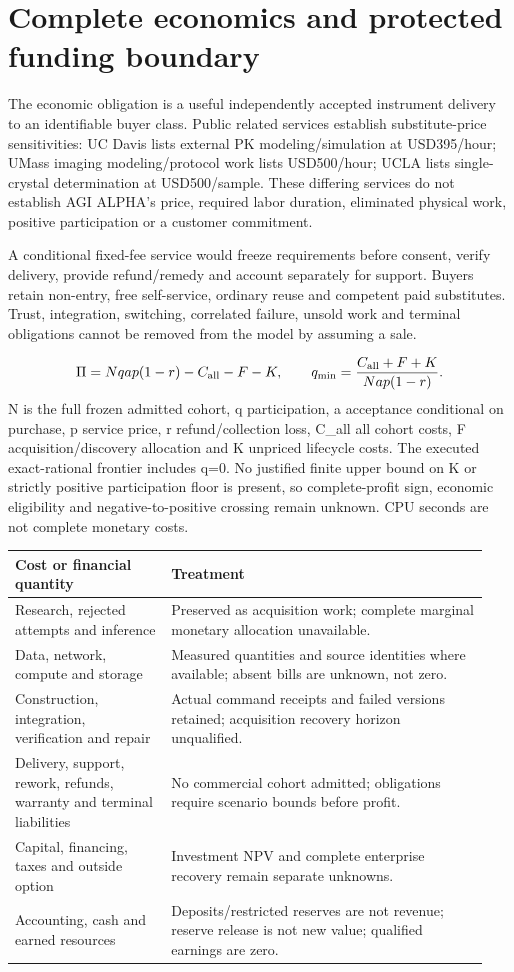 \documentclass[11pt,letterpaper]{article}
\begin{document}
\section{Complete economics and protected funding boundary}
The economic obligation is a useful independently accepted instrument delivery to an identifiable buyer class. Public related services establish substitute-price sensitivities: UC Davis lists external PK modeling/simulation at USD395/hour; UMass imaging modeling/protocol work lists USD500/hour; UCLA lists single-crystal determination at USD500/sample. These differing services do not establish AGI ALPHA's price, required labor duration, eliminated physical work, positive participation or a customer commitment.\par
A conditional fixed-fee service would freeze requirements before consent, verify delivery, provide refund/remedy and account separately for support. Buyers retain non-entry, free self-service, ordinary reuse and competent paid substitutes. Trust, integration, switching, correlated failure, unsold work and terminal obligations cannot be removed from the model by assuming a sale.\par
\[\Pi=Nqap(1-r)-C_{\rm all}-F-K,\qquad q_{\min}=\frac{C_{\rm all}+F+K}{Nap(1-r)}.\]
N is the full frozen admitted cohort, q participation, a acceptance conditional on purchase, p service price, r refund/collection loss, C\_all all cohort costs, F acquisition/discovery allocation and K unpriced lifecycle costs. The executed exact-rational frontier includes q=0. No justified finite upper bound on K or strictly positive participation floor is present, so complete-profit sign, economic eligibility and negative-to-positive crossing remain unknown. CPU seconds are not complete monetary costs.\par
\begingroup\small\begin{longtable}{>{\raggedright\arraybackslash}p{0.31\linewidth}>{\raggedright\arraybackslash}p{0.63\linewidth}}\toprule
\textbf{Cost or financial quantity} & \textbf{Treatment}\\\midrule\endhead
Research, rejected attempts and inference & Preserved as acquisition work; complete marginal monetary allocation unavailable.\\
Data, network, compute and storage & Measured quantities and source identities where available; absent bills are unknown, not zero.\\
Construction, integration, verification and repair & Actual command receipts and failed versions retained; acquisition recovery horizon unqualified.\\
Delivery, support, rework, refunds, warranty and terminal liabilities & No commercial cohort admitted; obligations require scenario bounds before profit.\\
Capital, financing, taxes and outside option & Investment NPV and complete enterprise recovery remain separate unknowns.\\
Accounting, cash and earned resources & Deposits/restricted reserves are not revenue; reserve release is not new value; qualified earnings are zero.\\
\bottomrule\end{longtable}\endgroup
\end{document}
